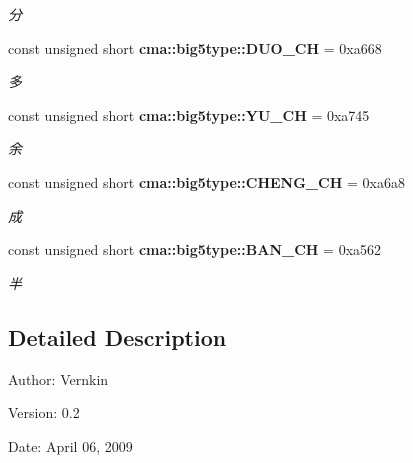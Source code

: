\begin{CompactItemize}
\begin{CompactList}\small\item\em 分 \item\end{CompactList}\item 
const unsigned short {\bf cma::big5type::DUO\_\-CH} = 0xa668\label{namespacecma_1_1big5type_1d5fd266d7448fa2f0ab3ed9ca390fca}

\begin{CompactList}\small\item\em 多 \item\end{CompactList}\item 
const unsigned short {\bf cma::big5type::YU\_\-CH} = 0xa745\label{namespacecma_1_1big5type_e6dac35944033f4c68276abe1e15bf4e}

\begin{CompactList}\small\item\em 余 \item\end{CompactList}\item 
const unsigned short {\bf cma::big5type::CHENG\_\-CH} = 0xa6a8\label{namespacecma_1_1big5type_bcf97c7f2e48d885c33280047c6b6f1d}

\begin{CompactList}\small\item\em 成 \item\end{CompactList}\item 
const unsigned short {\bf cma::big5type::BAN\_\-CH} = 0xa562\label{namespacecma_1_1big5type_02e5ecec79d29ddd78667e14417ff945}

\begin{CompactList}\small\item\em 半 \item\end{CompactList}\end{CompactItemize}


\subsection{Detailed Description}
\begin{Desc}
\item[Author:]Vernkin \end{Desc}
\begin{Desc}
\item[Version:]0.2 \end{Desc}
\begin{Desc}
\item[Date:]April 06, 2009 \end{Desc}
